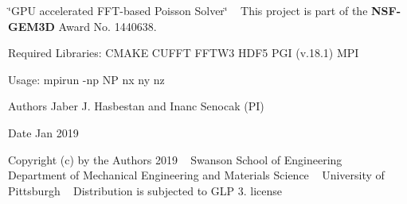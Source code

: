 \char`\"{}\+G\+P\+U accelerated F\+F\+T-\/based Poisson Solver\char`\"{} ~\newline
 This project is part of the {\bfseries N\+S\+F-\/\+G\+E\+M3D }Award No. 1440638. ~\newline


\begin{DoxyVerb}        Required Libraries:
          CMAKE
          CUFFT
          FFTW3
          HDF5
          PGI (v.18.1)
          MPI


        Usage:
        mpirun -np NP  nx ny nz 
\end{DoxyVerb}


\begin{DoxyAuthor}{Authors}
Jaber J. Hasbestan and Inanc Senocak (PI) ~\newline
 
\end{DoxyAuthor}
\begin{DoxyDate}{Date}
Jan 2019
\end{DoxyDate}
Copyright (c) by the Authors 2019 ~\newline
Swanson School of Engineering ~\newline
Department of Mechanical Engineering and Materials Science ~\newline
University of Pittsburgh ~\newline
 Distribution is subjected to G\+LP 3. license  